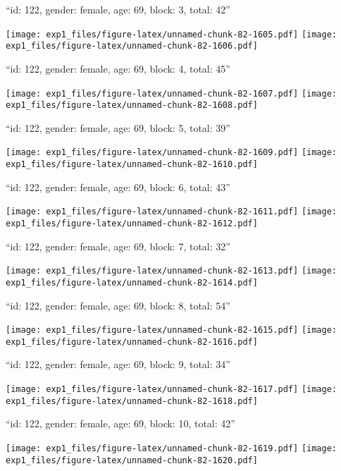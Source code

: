 \documentclass[11pt,,]{article}
\begin{document}
\newpage
[1] 

``id: 122, gender: female, age: 69, block: 3, total: 42''

\texttt{[image: exp1\_files/figure-latex/unnamed-chunk-82-1605.pdf]}
\texttt{[image: exp1\_files/figure-latex/unnamed-chunk-82-1606.pdf]}

\newpage
[1] 

``id: 122, gender: female, age: 69, block: 4, total: 45''

\texttt{[image: exp1\_files/figure-latex/unnamed-chunk-82-1607.pdf]}
\texttt{[image: exp1\_files/figure-latex/unnamed-chunk-82-1608.pdf]}

\newpage
[1] 

``id: 122, gender: female, age: 69, block: 5, total: 39''

\texttt{[image: exp1\_files/figure-latex/unnamed-chunk-82-1609.pdf]}
\texttt{[image: exp1\_files/figure-latex/unnamed-chunk-82-1610.pdf]}

\newpage
[1] 

``id: 122, gender: female, age: 69, block: 6, total: 43''

\texttt{[image: exp1\_files/figure-latex/unnamed-chunk-82-1611.pdf]}
\texttt{[image: exp1\_files/figure-latex/unnamed-chunk-82-1612.pdf]}

\newpage
[1] 

``id: 122, gender: female, age: 69, block: 7, total: 32''

\texttt{[image: exp1\_files/figure-latex/unnamed-chunk-82-1613.pdf]}
\texttt{[image: exp1\_files/figure-latex/unnamed-chunk-82-1614.pdf]}

\newpage
[1] 

``id: 122, gender: female, age: 69, block: 8, total: 54''

\texttt{[image: exp1\_files/figure-latex/unnamed-chunk-82-1615.pdf]}
\texttt{[image: exp1\_files/figure-latex/unnamed-chunk-82-1616.pdf]}

\newpage
[1] 

``id: 122, gender: female, age: 69, block: 9, total: 34''

\texttt{[image: exp1\_files/figure-latex/unnamed-chunk-82-1617.pdf]}
\texttt{[image: exp1\_files/figure-latex/unnamed-chunk-82-1618.pdf]}

\newpage
[1] 

``id: 122, gender: female, age: 69, block: 10, total: 42''

\texttt{[image: exp1\_files/figure-latex/unnamed-chunk-82-1619.pdf]}
\texttt{[image: exp1\_files/figure-latex/unnamed-chunk-82-1620.pdf]}
\end{document}

